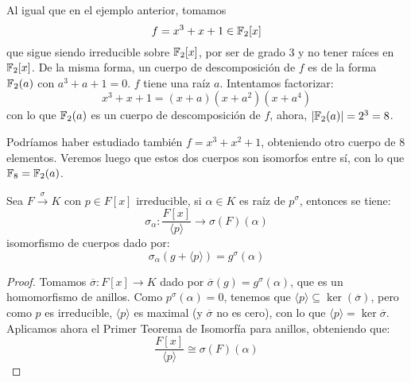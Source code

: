\begin{ejemplo}
    Al igual que en el ejemplo anterior, tomamos
    \begin{equation*}
        f = x^3+x+1 \in \mathbb{F}_2[x]
    \end{equation*}
    que sigue siendo irreducible sobre $\mathbb{F}_2[x]$, por ser de grado 3 y no tener raíces en $\mathbb{F}_2[x]$. De la misma forma, un cuerpo de descomposición de $f$ es de la forma $\mathbb{F}_2(a)$ con $a^3+a+1=0$. $f$ tiene una raíz $a$. Intentamos factorizar: %
    \begin{equation*}
        x^3+x+1 = (x+a)(x+a^2)(x+a^4)
    \end{equation*}
    con lo que $\mathbb{F}_2(a)$ es un cuerpo de descomposición de $f$, ahora, $|\mathbb{F}_2(a)| = 2^3 = 8$.

    \noindent
    Podríamos haber estudiado también $f=x^3+x^2+1$, obteniendo otro cuerpo de $8$ elementos. Veremos luego que estos dos cuerpos son isomorfos entre sí, con lo que $\mathbb{F}_8 = \mathbb{F}_2(a)$.
\end{ejemplo}

\begin{lema}
    Sea $F\stackrel{\sigma}{\to}{K}$ con $p\in F[x]$ irreducible, si $\alpha\in K$ es raíz de $p^\sigma$, entonces se tiene:
    \begin{equation*}
        \sigma_\alpha :\dfrac{F[x]}{\langle p \rangle }\to \sigma(F)(\alpha)
    \end{equation*}
    isomorfismo de cuerpos dado por:
    \begin{equation*}
        \sigma_\alpha(g+\langle p \rangle ) = g^\sigma(\alpha)
    \end{equation*}
    \begin{proof}
        Tomamos $\overline{\sigma}:F[x]\to K$ dado por $\overline{\sigma}(g) = g^\sigma(\alpha)$, que es un homomorfismo de anillos. Como $p^\sigma(\alpha)=0$, tenemos que $\langle p \rangle \subseteq \ker(\overline{\sigma})$, pero como $p$ es irreducible, $\langle p \rangle $ es maximal (y $\overline{\sigma}$ no es cero), con lo que $\langle p \rangle =\ker\overline{\sigma}$. Aplicamos ahora el Primer Teorema de Isomorfía para anillos, obteniendo que:
        \begin{equation*}
            \dfrac{F[x]}{\langle p \rangle } \cong \sigma(F)(\alpha)
        \end{equation*}
    \end{proof}
\end{lema}

